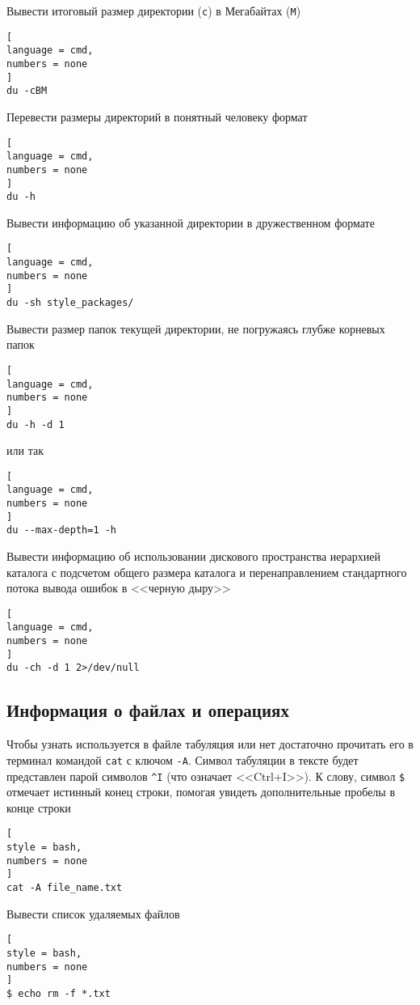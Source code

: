 \documentclass[%
	11pt,
	a4paper,
	utf8,
		]{article}
\begin{document}
Вывести итоговый размер директории (\texttt{c}) в Мегабайтах (\texttt{M})
\begin{lstlisting}[
language = cmd,
numbers = none
]
du -cBM
\end{lstlisting}

Перевести размеры директорий в понятный человеку формат
\begin{lstlisting}[
language = cmd,
numbers = none
]
du -h
\end{lstlisting}

Вывести информацию об указанной директории в дружественном формате
\begin{lstlisting}[
language = cmd,
numbers = none
]
du -sh style_packages/
\end{lstlisting}

Вывести размер папок текущей директории, не погружаясь глубже корневых папок
\begin{lstlisting}[
language = cmd,
numbers = none
]
du -h -d 1
\end{lstlisting}
или так
\begin{lstlisting}[
language = cmd,
numbers = none
]
du --max-depth=1 -h
\end{lstlisting}

Вывести информацию об использовании дискового пространства иерархией каталога с подсчетом общего размера каталога и перенаправлением стандартного потока вывода ошибок в <<черную дыру>>
\begin{lstlisting}[
language = cmd,
numbers = none
]
du -ch -d 1 2>/dev/null
\end{lstlisting}

\subsection{Информация о файлах и операциях}

Чтобы узнать используется в файле табуляция или нет достаточно прочитать его в терминал командой \texttt{cat} с ключом \verb|-A|. Символ табуляции в тексте будет представлен парой символов \verb|^I| (что означает <<Ctrl+I>>). К слову, символ \verb|$| отмечает истинный конец строки, помогая увидеть дополнительные пробелы в конце строки
\begin{lstlisting}[
style = bash,
numbers = none
]
cat -A file_name.txt
\end{lstlisting}

Вывести список удаляемых файлов
\begin{lstlisting}[
style = bash,
numbers = none
]
$ echo rm -f *.txt
\end{lstlisting}
\end{document}
